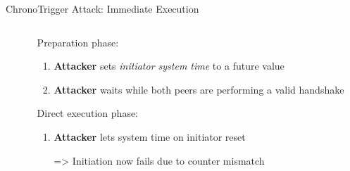 \begin{frame}{ChronoTrigger Attack: Immediate Execution}
\begin{columns}[fullwidth,T]
  \begin{column}{.5\linewidth}
  \end{column}

  \begin{column}{.46\linewidth}
    \small\leavevmode
      \begin{enumblock}{Preparation phase:}
      \begin{enumerate}
        \item \textbf{Attacker} sets \emph{initiator system time} to a future value
        \item \textbf{Attacker} waits while both peers are performing a valid handshake
      \end{enumerate}
      \end{enumblock}
      \begin{enumblock}{Direct execution phase:}
      \begin{enumerate}
        \item \textbf{Attacker} lets system time on initiator reset
        \item[=>] Initiation now fails due to counter mismatch
      \end{enumerate}
      \end{enumblock}
  \end{column}
\end{columns}
\end{frame}

